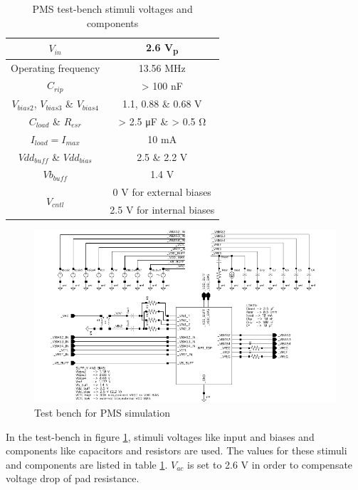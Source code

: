 \documentclass[12pt,a4paper,UKenglish]{report}
\begin{document}
\begin{table}[!htb]
\caption{PMS test-bench stimuli voltages and components} 
\begin{center}
\begin{tabular}{c|c}
\hline \hline
$V_{in} $			& 2.6 \si{\volt}\textsubscript{p} \\ \hline
Operating frequency	& 13.56 \si{\mega\hertz}	\\ \hline
$C_{rip}$ 		  	& > 100 \si{\nano\farad}	\\ \hline
$V_{bias2}$, $V_{bias3}$ \& $V_{bias4}$ & 1.1, 0.88 \& 0.68 \si{\volt} \\ \hline
$C_{load}$ \& $R_{esr}$ & > 2.5 \si{\micro\farad} \& > 0.5 \si{\ohm} \\ \hline
$I_{load} = I_{max}$ & 10 \si{\milli\ampere} \\ \hline
$Vdd_{buff}$ \& $Vdd_{bias}$ & 2.5 \& 2.2 \si{\volt} \\ \hline
$Vb_{buff}$ & 1.4 V \\ \hline
\multirow{2}{*}{$V_{cntl}$} 
			& 0 \si{\volt} for external biases \\ \cline{2-2}
			& 2.5 \si{\volt} for internal biases  \\ 
\hline \hline
\end{tabular}
\end{center}
\label{tab:pms_stimuli}
\end{table}%


\begin{figure} [H]
  \centering
  \includegraphics[width=1.05\textwidth]{img/pms_top_testbench.pdf} 
 \caption{Test bench for PMS simulation } 
\label{fig:wpt_top_testbench} 
\end{figure}

In the test-bench in figure \ref{fig:wpt_top_testbench}, stimuli voltages like input and biases and components like capacitors and resistors are used. 
The values for these stimuli and components are listed in table \ref{tab:pms_stimuli}. $V_{ac} $ is set to 2.6 V in
order to compensate voltage drop of pad resistance.  \\ 
\end{document}
